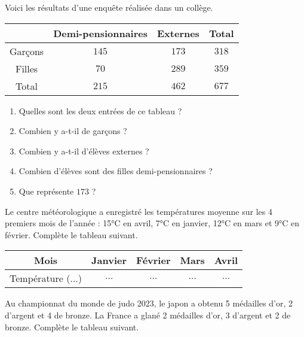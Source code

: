 \begin{pageAD} 



Voici les résultats d'une enquête réalisée dans un collège.

 \begin{center}
 \begin{tabular}{|c|c|c|c|}\hline 
  & Demi-pensionnaires & Externes & Total \\\hline 
  Garçons & $145$ & $173$ & $318$ \\\hline
  Filles & $70$ & $289$ & $359$ \\\hline
  Total & $215$ & $462$ & $677$ \\\hline 
 \end{tabular}
 \end{center}
 
 \begin{enumerate}[leftmargin=*]
 \item Quelles sont les deux entrées de ce tableau ? 
 \item Combien y a-t-il de garçons ? 
 \item Combien y a-t-il d'élèves externes ? 
 \item Combien d'élèves sont des filles demi-pensionnaires ?  
 \item Que représente $173$ ?  
\end{enumerate}



Le centre météorologique a enregistré les températures moyenne sur les 4 premiers mois de l'année : 15°C en avril, 7°C en janvier, 12°C en mars et 9°C en février. Complète le tableau suivant.

 \begin{center}
 \begin{tabular}{|c|c|c|c|c|}\hline 
  Mois & Janvier & Février & Mars & Avril \\\hline 
  Température ($\ldots$)& $\ldots$ & $\ldots$ & $\ldots$ & $\ldots$ \\\hline
 \end{tabular}
 \end{center}



Au championnat du monde de judo 2023, le japon a obtenu 5 médailles d'or, 2 d'argent et 4 de bronze. La France a glané 2 médailles d'or, 3 d'argent et 2 de bronze. Complète le tableau suivant.


\end{pageAD}
